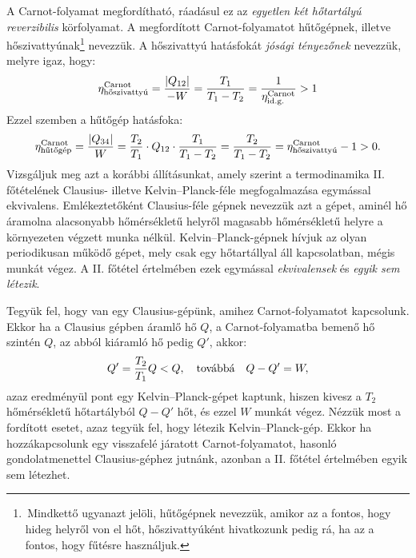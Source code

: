 A Carnot-folyamat megfordítható, ráadásul ez az \emph{egyetlen két hőtartályú reverzibilis} körfolyamat. A megfordított Carnot-folyamatot hűtőgépnek, illetve hőszivattyúnak\footnote{\,Mindkettő ugyanazt jelöli, hűtőgépnek nevezzük, amikor az a fontos, hogy hideg helyről von el hőt, hőszivattyúként hivatkozunk pedig rá, ha az a fontos, hogy fűtésre használjuk.} nevezzük. 
A hőszivattyú hatásfokát \emph{jósági tényezőnek} nevezzük, melyre igaz, hogy:
\begin{align}
	\eta_{\textnormal{hőszivattyú}}^{\textnormal{Carnot}} = \frac{|Q_{12}|}{-W} = \frac{T_1}{T_1-T_2} = \frac{1}{\eta_{\textnormal{id.g.}}^{\textnormal{Carnot}}}>1
\end{align}
Ezzel szemben a hűtőgép hatásfoka:
\begin{align}
	\eta_{\textnormal{hűtőgép}}^{\textnormal{Carnot}} = \frac{|Q_{34}|}{W} = \frac{T_2}{T_1}\cdot Q_{12}\cdot \frac{T_1}{T_1-T_2} = \frac{T_2}{T_1-T_2} = \eta_{\textnormal{hőszivattyú}}^{\textnormal{Carnot}}-1>0.
\end{align}
Vizsgáljuk meg azt a korábbi állításunkat, amely szerint a termodinamika II. főtételének Clausius- illetve Kelvin--Planck-féle megfogalmazása egymással ekvivalens. Emlékeztetőként Clausius-féle gépnek nevezzük azt a gépet, aminél hő áramolna alacsonyabb hőmérsékletű helyről magasabb hőmérsékletű helyre a környezeten végzett munka nélkül. Kelvin--Planck-gépnek hívjuk az olyan periodikusan működő gépet, mely csak egy hőtartállyal áll kapcsolatban, mégis munkát végez. A II. főtétel értelmében ezek egymással \emph{ekvivalensek} és \emph{egyik sem létezik}.

Tegyük fel, hogy van egy Clausius-gépünk, amihez Carnot-folyamatot kapcsolunk. Ekkor ha a Clausius gépben áramlő hő $Q$, a Carnot-folyamatba bemenő hő szintén $Q$, az abból kiáramló hő pedig $Q'$, akkor:
\begin{align}
	Q' = \frac{T_2}{T_1}Q<Q,\quad\textnormal{továbbá}\quad Q-Q'=W,
\end{align}	
azaz eredményül pont egy Kelvin--Planck-gépet kaptunk, hiszen kivesz a $T_2$ hőmérsékletű hőtartályból $Q-Q'$ hőt, és ezzel $W$ munkát végez. Nézzük most a fordított esetet, azaz tegyük fel, hogy létezik Kelvin--Planck-gép. Ekkor ha hozzákapcsolunk egy visszafelé járatott Carnot-folyamatot, hasonló gondolatmenettel Clausius-géphez jutnánk, azonban a II. főtétel értelmében egyik sem létezhet. 

